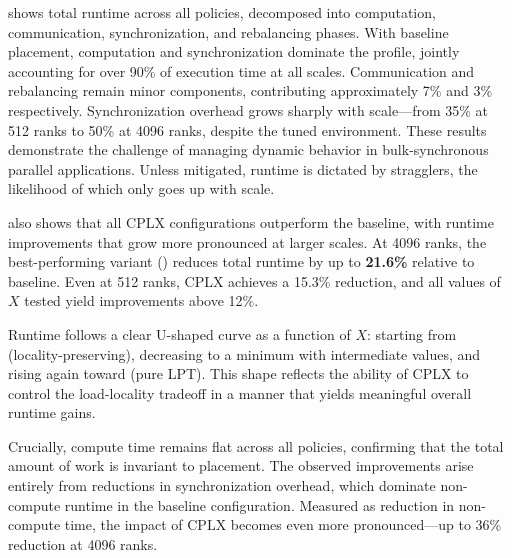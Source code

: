 
\noindent{} shows total runtime across all policies,
decomposed into computation, communication, synchronization, and rebalancing
phases.
With baseline placement, computation and synchronization dominate the profile, jointly accounting
for over 90\% of execution time at all scales.
Communication and rebalancing remain minor components, contributing approximately 7\% and 3\%
respectively.
Synchronization overhead grows sharply with scale---from 35\% at 512 ranks to 50\% at 4096 ranks,
despite the tuned environment.
These results demonstrate the challenge of managing dynamic behavior in bulk-synchronous parallel
applications.
Unless mitigated, runtime is dictated by stragglers, the likelihood of which only goes up with
scale.


\noindent{} also shows that all CPLX configurations outperform
the baseline, with runtime improvements that grow more pronounced at larger scales.
At 4096 ranks, the best-performing variant (\cple) reduces total runtime by up to \textbf{21.6\%}
relative to baseline.
Even at 512 ranks, CPLX achieves a 15.3\% reduction, and all values of $X$ tested yield
improvements above 12\%.

Runtime follows a clear U-shaped curve as a function of $X$: starting from \cpla{}
(locality-preserving), decreasing to a minimum with intermediate values, and rising again toward
\cple{} (pure LPT).
This shape reflects the ability of CPLX to control the load-locality tradeoff in a manner that
yields meaningful overall runtime gains.

Crucially, compute time remains flat across all policies, confirming that the total amount of work
is invariant to placement.
The observed improvements arise entirely from reductions in synchronization overhead, which
dominate non-compute runtime in the baseline configuration.
Measured as reduction in non-compute time, the impact of CPLX becomes even more pronounced---up to
36\% reduction at 4096 ranks.

\figAmrEvalTradeoff

